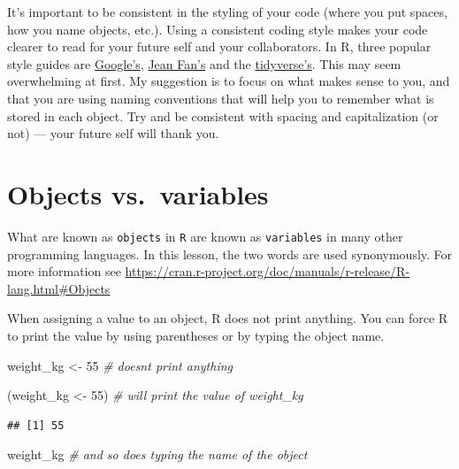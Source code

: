 \documentclass[
]{book}
\newenvironment{Shaded}{\begin{snugshade}}{\end{snugshade}}
\newcommand{\CommentTok}[1]{\textcolor[rgb]{0.56,0.35,0.01}{\textit{#1}}}
\newcommand{\DecValTok}[1]{\textcolor[rgb]{0.00,0.00,0.81}{#1}}
\newcommand{\NormalTok}[1]{#1}
\newcommand{\OtherTok}[1]{\textcolor[rgb]{0.56,0.35,0.01}{#1}}
\begin{document}
It's important to be consistent in the styling of your code (where you put spaces, how you name objects, etc.). Using a consistent coding style makes your code clearer to read for your future self and your collaborators. In R, three popular style guides are \href{https://google.github.io/styleguide/Rguide.xml}{Google's}, \href{\%22http://jef.works/R-style-guide/\%22}{Jean Fan's} and the \href{https://style.tidyverse.org/}{tidyverse's}.
This may seem overwhelming at first. My suggestion is to focus on what makes sense to you, and that you are using naming conventions that will help you to remember what is stored in each object. Try and be consistent with spacing and capitalization (or not) --- your future self will thank you.

\section{Objects vs.~variables}\label{objects-vs.-variables}

What are known as \texttt{objects} in \texttt{R} are known as \texttt{variables} in many other programming languages. In this lesson, the two words are used synonymously. For more information see \url{https://cran.r-project.org/doc/manuals/r-release/R-lang.html\#Objects}

When assigning a value to an object, R does not print anything. You can force R to print the value by using parentheses or by typing the object name.

\begin{Shaded}
\begin{Highlighting}[]
\NormalTok{weight\_kg }\OtherTok{\textless{}{-}} \DecValTok{55} \CommentTok{\#  doesn\textquotesingle{}t print anything}
\end{Highlighting}
\end{Shaded}

\begin{Shaded}
\begin{Highlighting}[]
\NormalTok{(weight\_kg }\OtherTok{\textless{}{-}} \DecValTok{55}\NormalTok{) }\CommentTok{\#  will print the value of \textasciigrave{}weight\_kg\textasciigrave{}}
\end{Highlighting}
\end{Shaded}

\begin{verbatim}
## [1] 55
\end{verbatim}

\begin{Shaded}
\begin{Highlighting}[]
\NormalTok{weight\_kg         }\CommentTok{\#  and so does typing the name of the object}
\end{Highlighting}
\end{Shaded}
\end{document}
